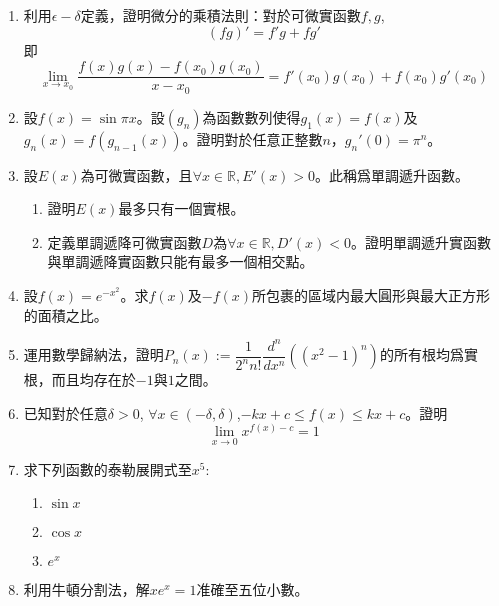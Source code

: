 \documentclass[12pt]{article}
\begin{document}
    \begin{enumerate}
        \item 利用$\epsilon-\delta$定義，證明微分的乘積法則：對於可微實函數$f,g$,$$(fg)'=f'g+fg'$$即$$\lim_{x\to x_0}\frac{f(x)g(x)-f(x_0)g(x_0)}{x-x_0}=f'(x_0)g(x_0)+f(x_0)g'(x_0)$$
        \item 設$f(x)=\sin{\pi x}$。設$(g_n)$為函數數列使得$g_1(x)=f(x)$及$g_n(x)=f(g_{n-1}(x))$。證明對於任意正整數$n$，$g_n'(0)=\pi^n$。
        \item 設$E(x)$為可微實函數，且$\forall x\in \mathbb{R}, E'(x)>0$。此稱爲單調遞升函數。\begin{enumerate}
            \item 證明$E(x)$最多只有一個實根。
            \item 定義單調遞降可微實函數$D$為$\forall x\in \mathbb{R}, D'(x)<0$。證明單調遞升實函數與單調遞降實函數只能有最多一個相交點。
        \end{enumerate}
        \item 設$f(x)=e^{-x^2}$。求$f(x)$及$-f(x)$所包裹的區域内最大圓形與最大正方形的面積之比。
        \item 運用數學歸納法，證明$P_n(x):=\dfrac{1}{2^n n!}\dfrac{d^n}{dx^n}((x^2-1)^n)$的所有根均爲實根，而且均存在於$-1$與$1$之間。
        \item 已知對於任意$\delta>0$, $\forall x\in (-\delta,\delta)$,$-kx+c\leq f(x)\leq kx+c$。證明$$\lim_{x\to 0}x^{f(x)-c}=1$$
        \item 求下列函數的泰勒展開式至$x^5$:\begin{enumerate}
            \item $\sin{x}$
            \item $\cos{x}$
            \item $e^x$
        \end{enumerate}
        \item 利用牛頓分割法，解$xe^x=1$准確至五位小數。
    \end{enumerate}
\end{document}

